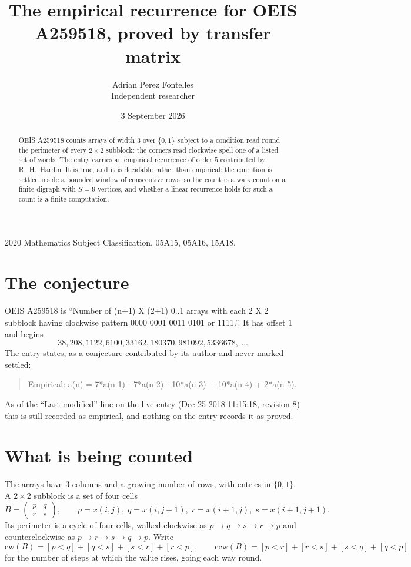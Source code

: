\documentclass[11pt,a4paper]{article}
\title{The empirical recurrence for OEIS A259518, proved by transfer matrix}
\author{Adrian Perez Fontelles\\ \small Independent researcher}
\date{3 September 2026}
\theoremstyle{plain}
\theoremstyle{definition}
\begin{document}
\maketitle

\begin{abstract}
OEIS A259518 counts arrays of width $3$ over $\{0,1\}$ subject to a condition read round the
perimeter of every $2\times2$ subblock: the corners read clockwise spell one of a listed set of words. The entry carries an empirical recurrence of
order $5$ contributed by R.~H.~Hardin. It is true, and it is decidable rather than
empirical: the condition is settled inside a bounded window of consecutive rows, so the
count is a walk count on a finite digraph with $S=9$ vertices, and whether a linear
recurrence holds for such a count is a finite computation.
\end{abstract}

\noindent\small 2020 Mathematics Subject Classification. 05A15, 05A16, 15A18.\normalsize

\section{The conjecture}

OEIS A259518 is ``Number of (n+1) X (2+1) 0..1 arrays with each 2 X 2 subblock having clockwise pattern 0000 0001 0011 0101 or 1111.''. It has offset $1$ and begins
\[
38, 208, 1122, 6100, 33162, 180370, 981092, 5336678,\ \dots
\]
The entry states, as a conjecture contributed by its author and never marked settled:
\begin{quote}
Empirical: a(n) = 7*a(n-1) - 7*a(n-2) - 10*a(n-3) + 10*a(n-4) + 2*a(n-5).
\end{quote}
As of the ``Last modified'' line on the live entry (Dec 25 2018 11:15:18, revision 8) this is still
recorded as empirical, and nothing on the entry records it as proved.

\section{What is being counted}

The arrays have $3$ columns and a growing number of rows, with entries in $\{0,1\}$. A
$2\times2$ subblock is a set of four cells
\[
B=\begin{pmatrix} p & q \\ r & s \end{pmatrix},
\qquad p=x(i,j),\; q=x(i,j+1),\; r=x(i+1,j),\; s=x(i+1,j+1).
\]
Its perimeter is a cycle of four cells, walked clockwise as $p\to q\to s\to r\to p$ and
counterclockwise as $p\to r\to s\to q\to p$. Write
\[
\mathrm{cw}(B)=[p<q]+[q<s]+[s<r]+[r<p],\qquad
\mathrm{ccw}(B)=[p<r]+[r<s]+[s<q]+[q<p]
\]
for the number of steps at which the value rises, going each way round.
\end{document}
